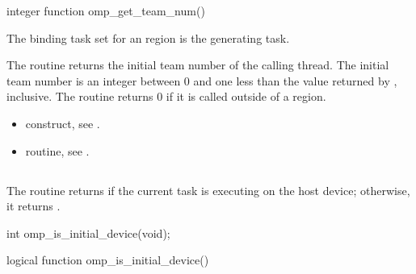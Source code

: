 \begin{fortranspecific}
\begin{ompfFunction}
integer function omp_get_team_num()
\end{ompfFunction}
\end{fortranspecific}

\binding
The binding task set for an  region is the generating task.

\effect
The  routine returns the initial team number of the calling thread. The 
initial team number is an integer between 0 and one less than the value returned by 
, inclusive. The routine returns 0 if it is called outside of a 
 region.

\crossreferences
\begin{itemize}
\item {} construct, see 
.

\item {} routine, see 
. 
\end{itemize}









\subsection{}
\label{subsec:omp_is_initial_device}
\summary
The  routine returns  if the current task is executing 
on the host device; otherwise, it returns .

\begin{samepage}
\format
\begin{ccppspecific}
\begin{ompcFunction}
int omp_is_initial_device(void);
\end{ompcFunction}
\end{ccppspecific}
\end{samepage}

\begin{fortranspecific}
\begin{ompfFunction}
logical function omp_is_initial_device()
\end{ompfFunction}
\end{fortranspecific}

